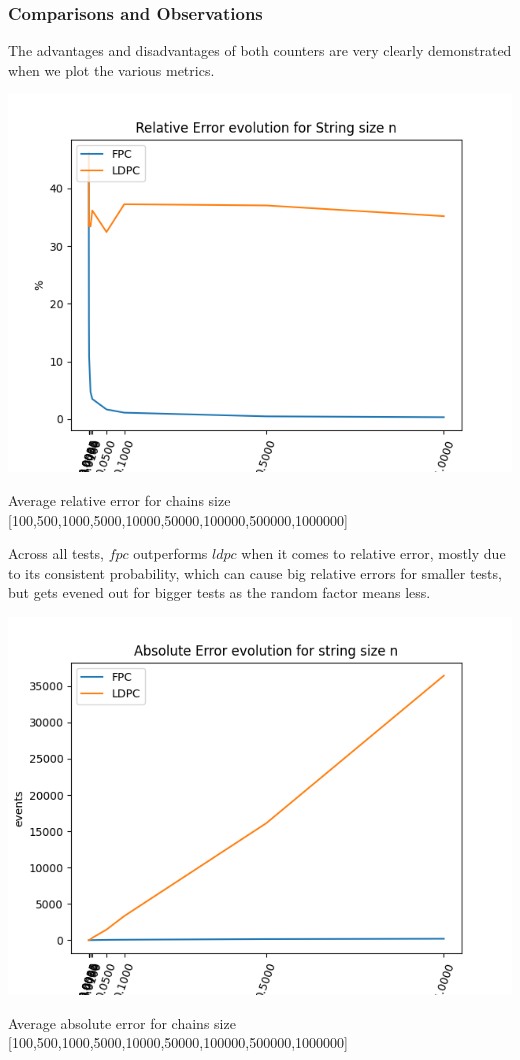 \documentclass[...]{revdetua}
\begin{document}
\subsubsection{Comparisons and Observations}
The advantages and disadvantages of both counters are very clearly demonstrated when we plot the various metrics.
\begin{table}[h]
\includegraphics[scale=0.5]{relative_error_big.png}
\caption{Average relative error for chains size [100,500,1000,5000,10000,50000,100000,500000,1000000]}
\end{table}
Across all tests, $fpc$ outperforms $ldpc$ when it comes to relative error, mostly due to its consistent probability, which can cause big relative errors for smaller tests, but gets evened out for bigger tests as the random factor means less.
\begin{table}[h]
\includegraphics[scale=0.5]{absolute_error_big.png}
\caption{Average absolute error for chains size [100,500,1000,5000,10000,50000,100000,500000,1000000]}
\end{table}
\end{document}
